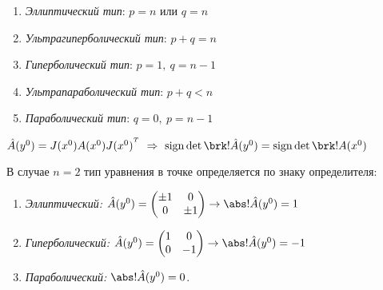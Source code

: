 \documentclass[../main.tex]{subfiles}
\begin{document}
\begin{enumerate}
  \item \textit{Эллиптический тип}: $p = n$ или $q = n$
  \item \textit{Ультрагиперболический тип}: $p+q = n$
  \item \textit{Гиперболический тип}: $p = 1,\ q = n-1$
  \item \textit{Ультрапараболический тип}: $p + q < n$
  \item \textit{Параболический тип}: $q = 0,\ p = n-1$
\end{enumerate}

\begin{remark}
$\hat{A}(y^0) = J(x^0)A(x^0)J(x^0)^\Transp 
\ \Rightarrow\ 
\sign\det\brk!{ \hat{A}(y^0) } = \sign\det\brk!{ A(x^0) }$ 
\end{remark}

В случае $n = 2$ тип уравнения в точке определяется по знаку определителя:
\begin{enumerate}

  \item \textit{Эллиптический: } $\hat{A}(y^0) = \begin{pmatrix}
    \pm1 & 0 \\ 0 & \pm1
    \end{pmatrix} \rightarrow \abs!{\hat{A}(y^0)} = 1$

  \item \textit{Гиперболический:} $\hat{A}(y^0) = \begin{pmatrix}
    1 & 0 \\ 0 & -1
    \end{pmatrix} \rightarrow \abs!{\hat{A}(y^0)} = -1$

  \item \textit{Параболический:}\; $\abs!{\hat{A}(y^0)} = 0$.
  
\end{enumerate}
\end{document}
